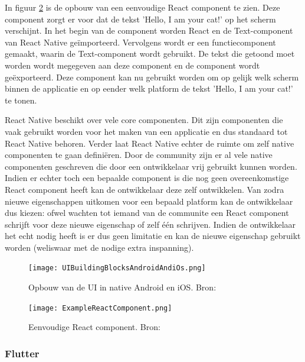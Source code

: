 In figuur \ref{fig:reactComponent} is de opbouw van een eenvoudige React component te zien. Deze component zorgt er voor dat de tekst 'Hello, I am your cat!' op het scherm verschijnt. In het begin van de component worden React en de Text-component van React Native geïmporteerd. Vervolgens wordt er een functiecomponent gemaakt, waarin de Text-component wordt gebruikt. De tekst die getoond moet worden wordt megegeven aan deze component en de component wordt geëxporteerd. Deze component kan nu gebruikt worden om op gelijk welk scherm binnen de applicatie en op eender welk platform de tekst 'Hello, I am your cat!' te tonen.


React Native beschikt over vele core componenten. Dit zijn componenten die vaak gebruikt worden voor het maken van een applicatie en dus standaard tot React Native behoren. Verder laat React Native echter de ruimte om zelf native componenten te gaan definiëren. Door de community zijn er al vele native componenten geschreven die door een ontwikkelaar vrij gebruikt kunnen worden. Indien er echter toch een bepaalde component is die nog geen overeenkomstige React component heeft kan de ontwikkelaar deze zelf ontwikkelen. Van zodra nieuwe eigenschappen uitkomen voor een bepaald platform kan de ontwikkelaar dus kiezen: ofwel wachten tot iemand van de communite een React component schrijft voor deze nieuwe eigenschap of zelf één schrijven. Indien de ontwikkelaar het echt nodig heeft is er dus geen limitatie en kan de nieuwe eigenschap gebruikt worden (weliswaar met de nodige extra inspanning).

\begin{figure}
    \texttt{[image: UIBuildingBlocksAndroidAndiOs.png]}
    \caption{Opbouw van de UI in native Android en iOS. Bron:
        \textcite{ReactNative.dev2020}}
    \label{fig:opbouwUIAndroidiOS}
\end{figure}

\begin{figure}
    \texttt{[image: ExampleReactComponent.png]}
    \caption{Eenvoudige React component. Bron:
        \textcite{ReactNative.dev2020}}
    \label{fig:reactComponent}
\end{figure}

\subsubsection{Flutter}
\label{subsubsec:opbouwUIFlutter}




